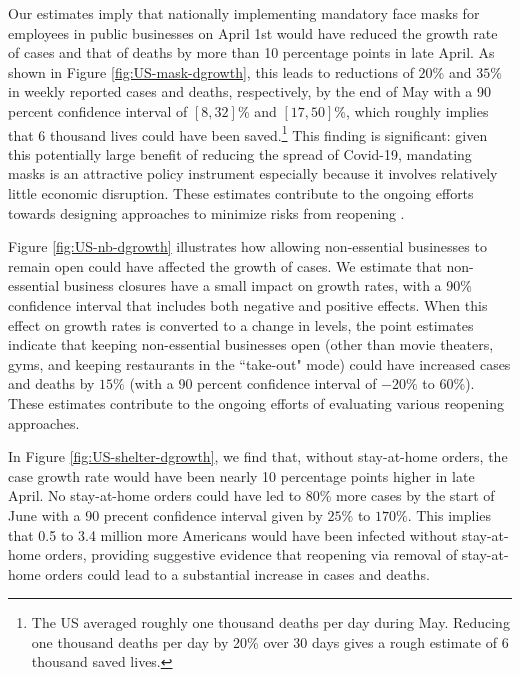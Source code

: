 \documentclass[11pt,reqno,letter]{amsart}
\theoremstyle{definition}
\begin{document}
Our estimates imply that nationally  implementing mandatory
face masks  for employees in public businesses on April 1st would have reduced the growth rate of cases
and that of deaths by more than 10 percentage points in late April. As
shown in Figure \ref{fig:US-mask-dgrowth}, this leads to reductions of
$20$\% and $35$\% in weekly reported cases and deaths, respectively,
by the end of May with a 90 percent confidence interval of $[8,32]$\%
and $[17,50]$\%, which roughly implies that 6 thousand lives could
have been saved.\footnote{The US averaged roughly one thousand deaths
  per day during May. Reducing one thousand deaths per day by 20\%
  over 30 days gives a rough estimate of 6 thousand saved lives.}
This finding is significant: given this potentially large  benefit of reducing the spread of Covid-19, mandating masks is an attractive policy instrument especially because it involves relatively little economic disruption. These estimates contribute to the ongoing efforts towards designing approaches to minimize risks from reopening \citep{stock2020b}.


Figure \ref{fig:US-nb-dgrowth} illustrates how allowing non-essential businesses to remain open could
have affected the growth of cases.  We estimate that
non-essential business closures have a small impact on growth rates,
with a 90\% confidence interval that includes both negative and
positive effects. When this effect on growth rates is converted to a
change in levels, the point estimates indicate that keeping
non-essential businesses open (other than movie theaters, gyms, and
keeping restaurants in the ``take-out" mode) could have increased
cases and  deaths by  $15\%$ (with a 90 percent confidence interval of
$-20\%$ to $60\%$).  These estimates contribute to the ongoing efforts of evaluating various reopening approaches.


In Figure \ref{fig:US-shelter-dgrowth}, we find that, without stay-at-home orders, the case
growth rate would have been nearly 10 percentage points higher in late April. No stay-at-home orders could have led to 80\% more cases by the start of June with a 90 precent confidence interval given by  $25\%$ to $170\%$. This implies that 0.5 to 3.4 million more Americans would have been infected without stay-at-home orders, providing suggestive evidence that reopening via removal of stay-at-home orders could lead to a substantial increase in cases and deaths.
\end{document}
